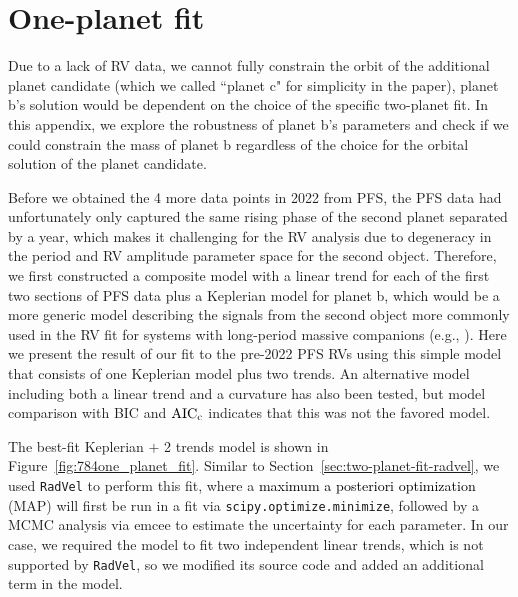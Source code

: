 \documentclass[twocolumn]{aastex631}
\newcommand{\rev}[1]{\textcolor{black}{#1}}
\newcommand{\code}[1]{{\texttt{#1}}}
\begin{document}
\section{One-planet fit}
\label{sec:one-planet-fit}

Due to a lack of RV data, we cannot fully constrain the orbit of the additional planet candidate (which we called ``planet c" for simplicity in the paper), planet b's solution would be dependent on the choice of the specific two-planet fit. In this appendix, we explore the robustness of planet b's parameters and check if we could constrain the mass of planet b regardless of the choice for the orbital solution of the planet candidate.

Before we obtained the 4 more data points in 2022 from PFS, the PFS data  had unfortunately only captured the same rising phase of the second planet separated by a year, which makes it challenging for the RV analysis due to degeneracy in the period and RV amplitude parameter space for the second object. Therefore, we first constructed a composite model with a linear trend for each of the first two sections of PFS data plus a Keplerian model for planet b, which would be a more generic model describing the signals from the second object more commonly used in the RV fit for systems with long-period massive companions (e.g., \citealt{crepp2012,montet2014}). Here we present the result of our fit to the pre-2022 PFS RVs using this simple model that consists of one Keplerian model plus two trends. An alternative model including both a linear trend and a curvature has also been tested, but model comparison with BIC and $\rm AIC_c$ indicates that this was not the favored model. 

The best-fit Keplerian $+$ 2 trends model is shown in Figure~\ref{fig:784one_planet_fit}. Similar to Section~\ref{sec:two-planet-fit-radvel}, we used \code{RadVel} \citep{Fulton2018_Radvel} to perform this fit, where a \rev{maximum a posteriori optimization} (MAP) will first be run in a fit via \code{scipy.optimize.minimize}, followed by a MCMC analysis via emcee \citep{emcee} to estimate the uncertainty for each parameter. In our case, we required the model to fit two independent linear trends, which is not supported by \code{RadVel}, so we modified its source code and added an additional term in the model.
\end{document}
